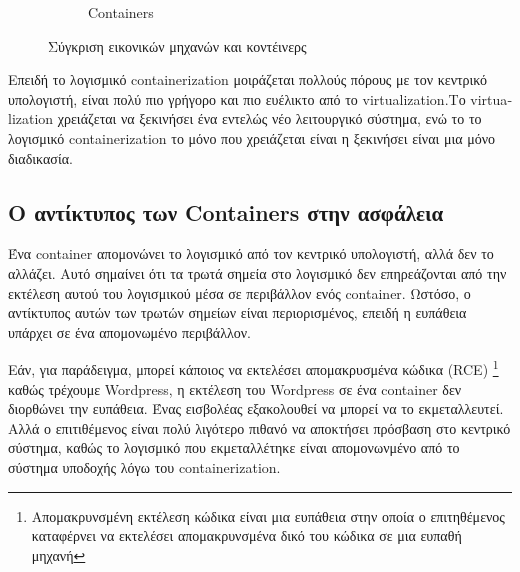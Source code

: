 \begin{figure}[ht]
\begin{subfigure}[t]{.45\textwidth}
        \caption{\textlatin{Containers}}
    \end{subfigure}
    \caption{Σύγκριση εικονικών μηχανών και κοντέινερς}
\end{figure}


Επειδή το λογισμικό \textlatin{containerization} μοιράζεται πολλούς πόρους με
τον κεντρικό υπολογιστή,
είναι πολύ πιο γρήγορο και πιο ευέλικτο από το \textlatin{virtualization}.Tο
\textlatin{virtualization} χρειάζεται να ξεκινήσει ένα εντελώς νέο λειτουργικό
σύστημα, ενώ το το λογισμικό \textlatin{containerization} το μόνο που
χρειάζεται είναι η ξεκινήσει είναι μια μόνο διαδικασία.

\subsection{Ο αντίκτυπος των \textlatin{Containers} στην ασφάλεια}

Ένα \textlatin{container} απομονώνει το λογισμικό από τον κεντρικό υπολογιστή,
αλλά δεν το αλλάζει. Αυτό σημαίνει ότι τα τρωτά σημεία στο λογισμικό δεν
επηρεάζονται από την εκτέλεση αυτού του λογισμικού μέσα σε περιβάλλον ενός
\textlatin{container}.
Ωστόσο, ο αντίκτυπος αυτών των τρωτών σημείων είναι περιορισμένος, επειδή η
ευπάθεια υπάρχει σε ένα απομονωμένο περιβάλλον.

Εάν, για παράδειγμα, μπορεί κάποιος να εκτελέσει απομακρυσμένα  κώδικα
(\textlatin{RCE})
\footnote{Απομακρυνσμένη εκτέλεση κώδικα είναι μια ευπάθεια στην οποία ο
επιτηθέμενος καταφέρνει να εκτελέσει απομακρυνσμένα δικό του κώδικα σε μια
ευπαθή μηχανή} καθώς τρέχουμε \textlatin{Wordpress}, η εκτέλεση του Wordpress
σε ένα \textlatin{container} δεν διορθώνει την ευπάθεια. Ένας εισβολέας
εξακολουθεί να μπορεί να το εκμεταλλευτεί. Αλλά ο επιτιθέμενος είναι
πολύ λιγότερο πιθανό να αποκτήσει πρόσβαση στο κεντρικό σύστημα, καθώς το
λογισμικό που εκμεταλλέτηκε είναι απομονωνμένο από το σύστημα υποδοχής λόγω του
\textlatin{containerization}.

